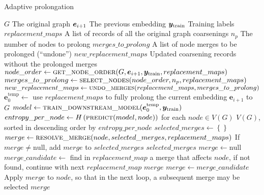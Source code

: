 \begin{algorithm}
  \caption{Adaptive prolongation}
  \label{alg:adaptive-prolongation}
  \begin{algorithmic}
    \Require $ G $ \Comment The original graph
    \Require $ \bm{e}_{i+1} $ \Comment The previous embedding
    \Require $ \bm{y}_\mathrm{train} $ \Comment Training labels
    \Require $ replacement\_maps $ \Comment A list of records of all the original graph coarsenings
    \Require $ n_p $ \Comment The number of nodes to prolong
    \Ensure $ merges\_to\_prolong $ \Comment A list of node merges to be prolonged (\enquote{undone})
    \Ensure $ new\_replacement\_maps $ \Comment Updated coarsening records without the prolonged merges
    \Statex
    \State $ node\_order \gets \Call{get\_node\_order}{G, \bm{e}_{i+1}, \bm{y}_\mathrm{train}, replacement\_maps} $
    \State $ merges\_to\_prolong \gets \Call{select\_nodes}{node\_order, n_p, replacement\_maps} $
    \State $ new\_replacement\_maps \gets \Call{undo\_merges}{replacement\_maps, merges\_to\_prolong} $
    \Statex
        \State $ \bm{e}_0^\mathrm{temp} \gets $ use $ replacement\_maps $ to fully prolong the current embedding $ \bm{e}_{i+1} $ to $ G $
        \State $ model \gets \Call{train\_downstream\_model}{\bm{e}_0^\mathrm{temp}, \bm{y}_\mathrm{train}} $
        \State $ entropy\_per\_node \gets H \left( \Call{predict}{model, node} \right) $ for each $ node \in V \left( G \right) $
        \State \Return $ V \left( G \right) $, sorted in descending order by $ entropy\_per\_node $
    \EndFunction
    \Statex
        \State $ selected\_merges \gets \left\{ \right\} $
            \State $ merge \gets \Call{resolve\_merge}{node, selected\_merges, replacement\_maps} $
            \State If $ merge \neq \mathrm{null} $, add $ merge $ to $ selected\_merges $
        \EndFor
        \State \Return $ selected\_merges $
    \EndFunction
    \Statex
        \State $ merge \gets \mathrm{null} $
            \State $ merge\_candidate \gets $ find in $ replacement\_map $ a merge that affects $ node $, if not found, continue with next $ replacement\_map $
                \State \Return $ merge $
            \EndIf
            \State $ merge \gets merge\_candidate $
            \State Apply $ merge $ to $ node $, so that in the next loop, a subsequent merge may be selected
        \EndFor
        \State \Return $ merge $
    \EndFunction
  \end{algorithmic}
\end{algorithm}

